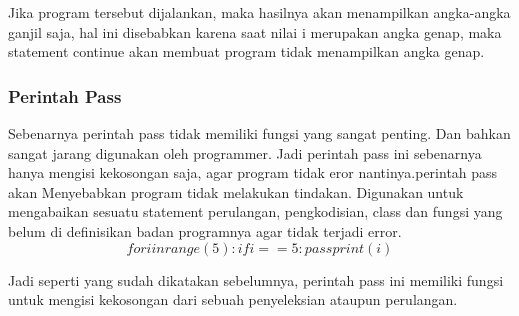 Jika program tersebut dijalankan, maka hasilnya akan menampilkan angka-angka ganjil saja, hal ini disebabkan karena saat nilai i merupakan angka genap, maka statement continue akan membuat program tidak menampilkan angka genap.

\subsubsection{Perintah Pass}
Sebenarnya perintah pass tidak memiliki fungsi yang sangat penting. Dan bahkan sangat jarang digunakan oleh programmer. Jadi perintah pass ini sebenarnya hanya mengisi kekosongan saja, agar program tidak eror nantinya.perintah pass akan Menyebabkan program tidak melakukan tindakan. Digunakan untuk mengabaikan sesuatu statement perulangan, pengkodisian, class dan fungsi yang belum di definisikan badan programnya agar tidak terjadi error.
\begin{equation}
for i in range (5) :
    if i == 5 :
        pass
    print(i)
    \end{equation}

Jadi seperti yang sudah dikatakan sebelumnya, perintah pass ini memiliki fungsi untuk mengisi kekosongan dari sebuah penyeleksian ataupun perulangan.


